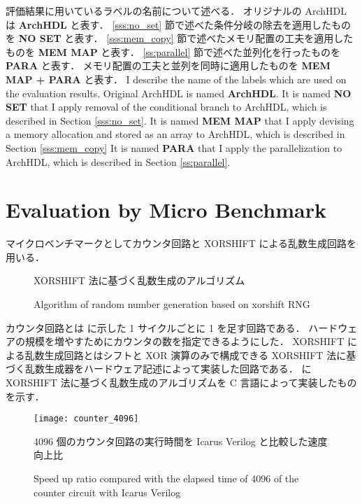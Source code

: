 評価結果に用いているラベルの名前について述べる．
オリジナルの ArchHDL は \textbf{ArchHDL} と表す．
\ref{sss:no_set} 節で述べた条件分岐の除去を適用したものを \textbf{NO SET} と表す．
\ref{sss:mem_copy} 節で述べたメモリ配置の工夫を適用したものを \textbf{MEM MAP} と表す．
\ref{ss:parallel} 節で述べた並列化を行ったものを \textbf{PARA} と表す．
メモリ配置の工夫と並列を同時に適用したものを \textbf{MEM MAP + PARA} と表す．
\fi
I describe the name of the labels which are used on the evaluation results.
Original ArchHDL is named \textbf{ArchHDL}.
It is named \textbf{NO SET} that I apply removal of the conditional branch to ArchHDL, which is described in Section \ref{sss:no_set}.
It is named \textbf{MEM MAP} that I apply devising a memory allocation and stored as an array to ArchHDL, which is described in Section \ref{sss:mem_copy}
It is named \textbf{PARA} that I apply the parallelization to ArchHDL, which is described in Section \ref{ss:parallel}.


\section{Evaluation by Micro Benchmark}

マイクロベンチマークとしてカウンタ回路と XORSHIFT による乱数生成回路を用いる．

\begin{figure}[tb]
 
 \caption{XORSHIFT 法に基づく乱数生成のアルゴリズム}
\fi
 \caption{Algorithm of random number generation based on xorshift RNG}
 \label{src:xorshift_alg}
\end{figure}

カウンタ回路とは  に示した 1 サイクルごとに 1 を足す回路である．
ハードウェアの規模を増やすためにカウンタの数を指定できるようにした．
XORSHIFT による乱数生成回路とはシフトと XOR 演算のみで構成できる XORSHIFT 法に基づく乱数生成器をハードウェア記述によって実装した回路である．
 に XORSHIFT 法に基づく乱数生成のアルゴリズムを C 言語によって実装したものを示す．

\begin{figure}[tb]
 \centering
 \texttt{[image: counter\_4096]}
 \caption{4096 個のカウンタ回路の実行時間を Icarus Verilog と比較した速度向上比}
\fi
 \caption{Speed up ratio compared with the elapsed time of 4096 of the counter circuit with Icarus Verilog}
 \label{fig:counter4096}
\end{figure}

